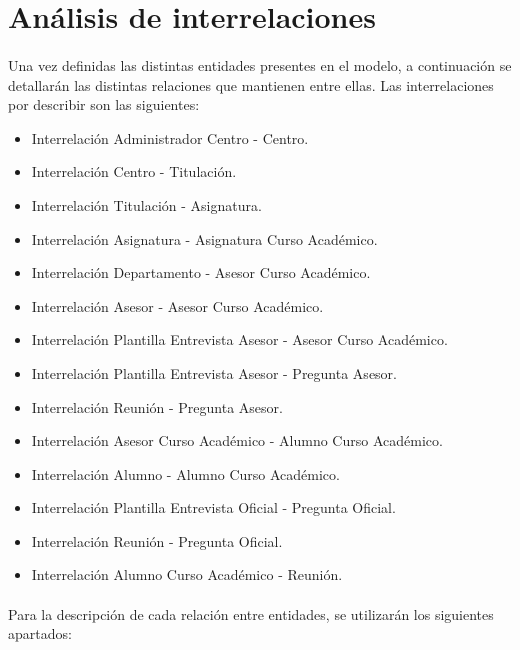 \section{Análisis de interrelaciones}

   \paragraph{}Una vez definidas las distintas entidades presentes en el
   modelo, a continuación se detallarán las distintas relaciones que mantienen
   entre ellas. Las interrelaciones por describir son las siguientes:

   \begin{itemize}
    \item Interrelación Administrador Centro - Centro.
    \item Interrelación Centro - Titulación.
    \item Interrelación Titulación - Asignatura.
    \item Interrelación Asignatura - Asignatura Curso Académico.
    \item Interrelación Departamento - Asesor Curso Académico.
    \item Interrelación Asesor - Asesor Curso Académico.
    \item Interrelación Plantilla Entrevista Asesor - Asesor Curso Académico.
    \item Interrelación Plantilla Entrevista Asesor - Pregunta Asesor.
    \item Interrelación Reunión - Pregunta Asesor.
    \item Interrelación Asesor Curso Académico - Alumno Curso Académico.
    \item Interrelación Alumno - Alumno Curso Académico.
    \item Interrelación Plantilla Entrevista Oficial - Pregunta Oficial.
    \item Interrelación Reunión - Pregunta Oficial.
    \item Interrelación Alumno Curso Académico - Reunión.
   \end{itemize}

   \paragraph{}Para la descripción de cada relación entre entidades, se
   utilizarán los siguientes apartados:

